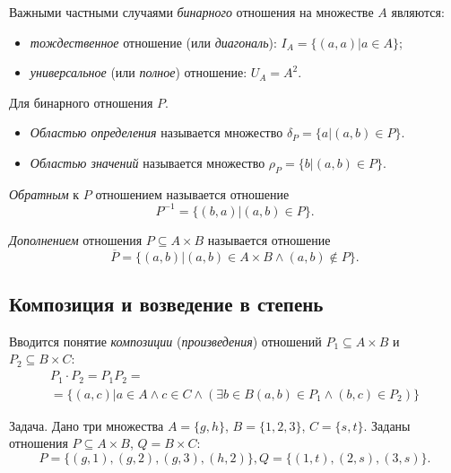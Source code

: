 Важными частными случаями \emph{бинарного} отношения на множестве $A$ являются:
\begin{itemize}
    \item \emph{тождественное} отношение (или \emph{диагональ}): $I_A=\{(a,a)|a\in A\}$;
    \item \emph{универсальное} (или \emph{полное}) отношение: $U_A=A^2$.
\end{itemize}

Для бинарного отношения $P$.
\begin{itemize}
    \item \emph{Областью определения} называется множество $\delta_P=\{a|(a,b)\in P\}$.
    \item \emph{Областью значений} называется множество $\rho_P=\{b|(a,b)\in P\}$.
\end{itemize}

\emph{Обратным} к $P$ отношением называется отношение
\[P^{-1}=\{(b,a)|(a,b)\in P\}.\]

\emph{Дополнением} отношения $P\subseteq A\times B$ называется отношение
\[\overline{P}=\{(a,b)|(a,b)\in A\times B\land (a,b)\not\in P\}.\]


\subsection{Композиция и возведение в степень}

Вводится понятие \emph{композиции} (\emph{произведения}) отношений $P_1\subseteq A\times B$ и $P_2\subseteq B\times C$:
\begin{equation}
    \label{eq:binPComposition}
    \begin{split}
        P_1\cdot P_2 = P_1P_2 = \\
        = \{(a,c)|a\in A\land c\in C\land (\exists b\in B (a,b)\in P_1\land (b,c)\in P_2)\}
    \end{split}
\end{equation}

\begin{exampl} Задача. 
    \label{exampl:binPComposition}
    Дано три множества $A=\{g,h\}$, $B=\{1,2,3\}$, $C=\{s,t\}$. Заданы отношения $P\subseteq A\times B$, $Q=B\times C$: 
    \[P=\{(g,1),(g,2),(g,3),(h,2)\},Q=\{(1,t),(2,s),(3,s)\}.\]
\end{exampl}

